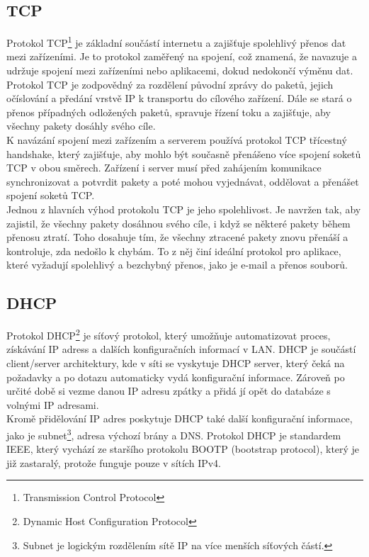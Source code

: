 \documentclass[12pt]{report}			%
\begin{document}
				\subsection{TCP}
Protokol TCP\footnote{Transmission Control Protocol} je základní součástí internetu a zajišťuje spolehlivý přenos dat mezi zařízeními. Je to protokol zaměřený na spojení, což znamená, že navazuje a udržuje spojení mezi zařízeními nebo aplikacemi, dokud nedokončí výměnu dat.
\\
Protokol TCP je zodpovědný za rozdělení původní zprávy do paketů, jejich očíslování a předání vrstvě IP k transportu do cílového zařízení. Dále se stará o přenos případných odložených paketů, spravuje řízení toku a zajišťuje, aby všechny pakety dosáhly svého cíle.
\\
K navázání spojení mezi zařízením a serverem používá protokol TCP třícestný handshake, který zajišťuje, aby mohlo být současně přenášeno více spojení soketů TCP v obou směrech. Zařízení i server musí před zahájením komunikace synchronizovat a potvrdit pakety a poté mohou vyjednávat, oddělovat a přenášet spojení soketů TCP.
\\
Jednou z hlavních výhod protokolu TCP je jeho spolehlivost. Je navržen tak, aby zajistil, že všechny pakety dosáhnou svého cíle, i když se některé pakety během přenosu ztratí. Toho dosahuje tím, že všechny ztracené pakety znovu přenáší a kontroluje, zda nedošlo k chybám. To z něj činí ideální protokol pro aplikace, které vyžadují spolehlivý a bezchybný přenos, jako je e-mail a přenos souborů.


\cite{Pruvodce}
\cite{TCP}
\cite{TCP1}
\cite{TCP2}



				\subsection{DHCP}
Protokol DHCP\footnote{Dynamic Host Configuration Protocol} je síťový protokol, který umožňuje automatizovat proces, získávání IP adress a dalších konfiguračních informací v LAN. DHCP je součástí client/server architektury, kde v síti se vyskytuje DHCP server, který čeká na požadavky a po dotazu automaticky vydá konfigurační informace. Zároveň po určité době si vezme danou IP adresu zpátky a přidá jí opět do databáze s volnými IP adresami. 
\\
Kromě přidělování IP adres poskytuje DHCP také další  konfigurační informace, jako je subnet\footnote{Subnet je logickým rozdělením sítě IP na více menších síťových částí.}, adresa výchozí brány a DNS. Protokol DHCP je standardem IEEE, který vychází ze staršího protokolu BOOTP (bootstrap protocol), který je již zastaralý, protože funguje pouze v sítích IPv4.
\end{document}
